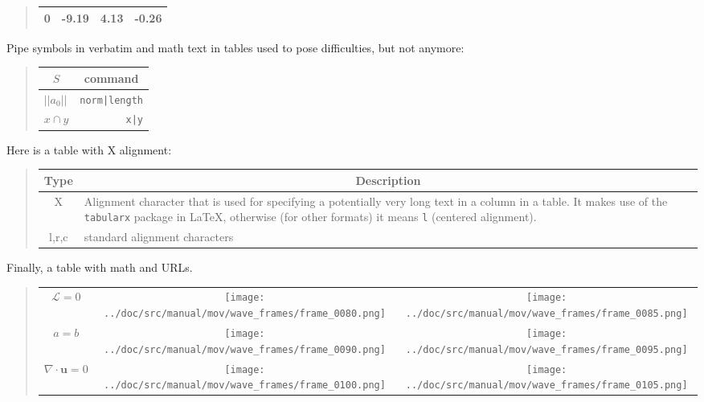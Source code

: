 \documentclass[%
oneside,                 %
final,                   %
10pt]{article}
\theoremstyle{definition}
\begin{document}
\begin{enumerate}
\begin{quote}
\begin{tabular}{rrrr}
0     & -9.19      & 4.13               & -0.26          \\
\hline
\end{tabular}
\end{quote}
\noindent
Pipe symbols in verbatim and math text in tables used to pose difficulties,
but not
anymore:
\begin{quote}
\begin{tabular}{lr}
\hline
\multicolumn{1}{c}{ $S$ } & \multicolumn{1}{c}{ command } \\
\hline
$ ||a_0|| $ & \texttt{norm|length} \\
$x\cap y$   & \texttt{x|y}         \\
\hline
\end{tabular}
\end{quote}
\noindent
Here is a table with X alignment:
\begin{quote}
\begin{tabularx}{\linewidth}{cX}
\hline
\multicolumn{1}{c}{ Type } & \multicolumn{1}{c}{ Description } \\
\hline
X     & Alignment character that is used for specifying a potentially very long text in a column in a table. It makes use of the \texttt{tabularx} package in {\LaTeX}, otherwise (for other formats) it means \texttt{l} (centered alignment). \\
l,r,c & standard alignment characters                                                                                                                                                                                                       \\
\hline
\end{tabularx}
\end{quote}
\noindent
Finally, a table with math
and URLs.
\begin{quote}
\begin{tabular}{ccc}
\hline
 \\
\hline
$\mathcal{L}=0$         & \texttt{[image: ../doc/src/manual/mov/wave\_frames/frame\_0080.png]} & \texttt{[image: ../doc/src/manual/mov/wave\_frames/frame\_0085.png]} \\
$a=b$                   & \texttt{[image: ../doc/src/manual/mov/wave\_frames/frame\_0090.png]} & \texttt{[image: ../doc/src/manual/mov/wave\_frames/frame\_0095.png]} \\
$\nabla\cdot\bm{u} =0 $ & \texttt{[image: ../doc/src/manual/mov/wave\_frames/frame\_0100.png]} & \texttt{[image: ../doc/src/manual/mov/wave\_frames/frame\_0105.png]} \\
\hline
\end{tabular}
\end{quote}
\noindent

\end{enumerate}
\end{document}
